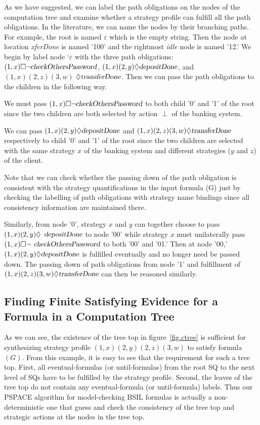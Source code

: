 As we have suggested, we can label the path obligations on the nodes of the computation tree and examine whether a strategy profile can fulfill all the path obligations.
In the literature, we can name the nodes by their branching paths.
For example, the root is named $\varepsilon$ which is the empty string. 
Then the node at location {\em xferDone} is named '100' and 
the rightmost {\em idle} node is named '12.' 
We begin by label node `$\varepsilon$ with the three path obligations: 
$(1,x) \Box \neg \mbox{\sl checkOthersPassword}$, 
$(1,x)(2,y)\Diamond \mbox{\sl depositDone}$, and $(1,x)(2,z)(3,w)$ $\Diamond\mbox{\sl transferDone}$.  
Then we can pass the path obligations to the children in the following way. 
\begin{list1}
\item We must pass $(1,x) \Box \neg \mbox{\sl checkOthersPassword}$ to 
  both child '0' and '1' of the root since the two children 
  are both selected by action $\perp$ of the banking system. 
\item We can pass $(1,x)(2,y)\Diamond \mbox{\sl depositDone}$ 
	and $(1,x)(2,z)(3,w)\Diamond\mbox{\sl transferDone}$ respectively to 
	child '0' and '1' of the root since 
	the two children are selected with the same strategy $x$ of the banking system 
	and different strategies ($y$ and $z$) of the client.  
\end{list1} 
Note that we can check whether the passing down of the path obligation is consistent with the strategy quantifications in the input formula (G) just by checking the labelling of path obligations with strategy name bindings since all consistency information are maintained there.

Similarly, from node '0', strategy $x$ and $y$ can together choose to pass 
$(1,x)(2,y)\Diamond$ $\mbox{\sl depositDone}$ to node '00' while strategy $x$ must unilaterally pass 
$(1,x) \Box \neg$ $\mbox{\sl checkOthersPassword}$ 
to both '00' and '01.'  
Then at node '00,' $(1,x)(2,y)\Diamond \mbox{\sl depositDone}$ is fulfilled 
eventually and no longer need be passed down.  
The passing down of path obligations from node '1' and fulfillment of 
$(1,x)(2,z)(3,w)\Diamond\mbox{\sl transferDone}$ can then be reasoned similarly.
 
\subsection{Finding Finite Satisfying Evidence for a Formula in a Computation Tree}
As we can see, the existence of the tree top in figure~\ref{fig.ctree} is sufficient for synthesizing strategy profile $(1,x)(2,y)(2,z)(3,w)$ to satisfy formula $(G)$.  
From this example, it is easy to see that the requirement for such a tree top.  
First, all eventual-formulas (or until-formulas) from the root SQ to the next level of SQs have to be fulfilled by the strategy profile.
Second, the leaves of the tree top do not contain any eventual-formula (or until-formula) labels.
Thus our PSPACE algorithm for model-checking BSIL formulas is actually a non-deterministic one that guess and check the consistency of the tree top and strategic actions at the nodes in the tree top.  

